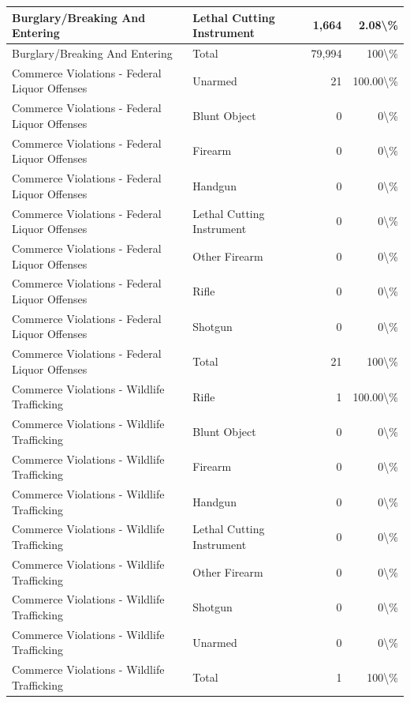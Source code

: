 \documentclass[
]{krantz}
\begin{document}
\begin{longtable}[t]{l|l|r|r}
Burglary/Breaking And Entering & Lethal Cutting Instrument & 1,664 & 2.08\textbackslash{}\%\\
\hline
Burglary/Breaking And Entering & Total & 79,994 & 100\textbackslash{}\%\\
\hline
Commerce Violations - Federal Liquor Offenses & Unarmed & 21 & 100.00\textbackslash{}\%\\
\hline
Commerce Violations - Federal Liquor Offenses & Blunt Object & 0 & 0\textbackslash{}\%\\
\hline
Commerce Violations - Federal Liquor Offenses & Firearm & 0 & 0\textbackslash{}\%\\
\hline
Commerce Violations - Federal Liquor Offenses & Handgun & 0 & 0\textbackslash{}\%\\
\hline
Commerce Violations - Federal Liquor Offenses & Lethal Cutting Instrument & 0 & 0\textbackslash{}\%\\
\hline
Commerce Violations - Federal Liquor Offenses & Other Firearm & 0 & 0\textbackslash{}\%\\
\hline
Commerce Violations - Federal Liquor Offenses & Rifle & 0 & 0\textbackslash{}\%\\
\hline
Commerce Violations - Federal Liquor Offenses & Shotgun & 0 & 0\textbackslash{}\%\\
\hline
Commerce Violations - Federal Liquor Offenses & Total & 21 & 100\textbackslash{}\%\\
\hline
Commerce Violations - Wildlife Trafficking & Rifle & 1 & 100.00\textbackslash{}\%\\
\hline
Commerce Violations - Wildlife Trafficking & Blunt Object & 0 & 0\textbackslash{}\%\\
\hline
Commerce Violations - Wildlife Trafficking & Firearm & 0 & 0\textbackslash{}\%\\
\hline
Commerce Violations - Wildlife Trafficking & Handgun & 0 & 0\textbackslash{}\%\\
\hline
Commerce Violations - Wildlife Trafficking & Lethal Cutting Instrument & 0 & 0\textbackslash{}\%\\
\hline
Commerce Violations - Wildlife Trafficking & Other Firearm & 0 & 0\textbackslash{}\%\\
\hline
Commerce Violations - Wildlife Trafficking & Shotgun & 0 & 0\textbackslash{}\%\\
\hline
Commerce Violations - Wildlife Trafficking & Unarmed & 0 & 0\textbackslash{}\%\\
\hline
Commerce Violations - Wildlife Trafficking & Total & 1 & 100\textbackslash{}\%\\

\end{longtable}
\end{document}
